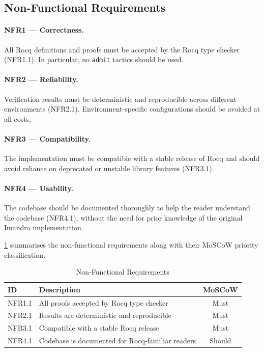 \subsection{Non-Functional Requirements} \label{sec:non-fun-requirements}

\paragraph*{NFR1 --- Correctness.} All Rocq definitions and proofs must be accepted by the Rocq type checker (NFR1.1). In particular, no \texttt{admit} tactics should be used.

\paragraph*{NFR2 --- Reliability.} Verification results must be deterministic and reproducible across different environments (NFR2.1). Environment-specific configurations should be avoided at all costs.

\paragraph*{NFR3 --- Compatibility.} The implementation must be compatible with a stable release of Rocq and should avoid reliance on deprecated or unstable library features (NFR3.1).

\paragraph*{NFR4 --- Usability.} The codebase should be documented thoroughly to help the reader understand the codebase (NFR4.1), without the need for prior knowledge of the original Imandra implementation.

\cref{tab:non-fun-requirements-sub} summarises the non-functional requirements
along with their MoSCoW priority classification.

\begin{table}[h]
\centering
\begin{tabularx}{\textwidth}{l X c }
\toprule
\textbf{ID} & \textbf{Description} & \textbf{MoSCoW} \\
\midrule
NFR1.1 & All proofs accepted by Rocq type checker  & Must \\
NFR2.1 & Results are deterministic and reproducible & Must \\
NFR3.1 & Compatible with a stable Rocq release & Must \\
NFR4.1 & Codebase is documented for Rocq-familiar readers & Should \\
\bottomrule
\end{tabularx}
\caption{Non-Functional Requirements}
\label{tab:non-fun-requirements-sub}
\end{table}

